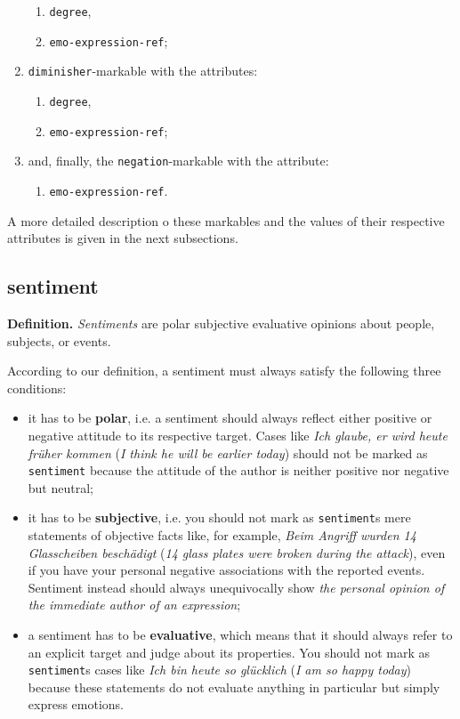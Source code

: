 \documentclass[11pt,a4paper]{article}
\theoremstyle{mytheoremstyle}
\begin{document}
\begin{multicols}{2}
\begin{enumerate}
    \begin{enumerate}
    \item \texttt{degree},
    \item \texttt{emo-expression-ref};
    \end{enumerate}
  \item \texttt{diminisher}-markable with the attributes:
    \begin{enumerate}
    \item \texttt{degree},
    \item \texttt{emo-expression-ref};
    \end{enumerate}
  \item and, finally, the \texttt{negation}-markable with the
    attribute:
    \begin{enumerate}
    \item \texttt{emo-expression-ref}.
    \end{enumerate}
  \end{enumerate}
\end{multicols}
\noindent{}A more detailed description o these markables and the
values of their respective attributes is given in the next
subsections.

\subsection{sentiment}\label{sec:sentiment}
\noindent\textbf{Definition.} \emph{Sentiments} are polar subjective
evaluative opinions about people, subjects, or events.

According to our definition, a sentiment must always satisfy the
following three conditions:
\begin{itemize}
\item it has to be \textbf{polar}, i.e. a sentiment should always
  reflect either positive or negative attitude to its respective
  target.  Cases like \textit{Ich glaube, er wird heute fr\"uher
    kommen} (\textit{I think he will be earlier today}) should not be
  marked as \texttt{sentiment} because the attitude of the author is
  neither positive nor negative but neutral;

\item it has to be \textbf{subjective}, i.e. you should not mark as
  \texttt{sentiment}s mere statements of objective facts like, for
  example, \textit{Beim Angriff wurden 14 Glasscheiben besch\"adigt}
  (\textit{14 glass plates were broken during the attack}), even if
  you have your personal negative associations with the reported
  events.  Sentiment instead should always unequivocally show
  \emph{the personal opinion of the immediate author of an
    expression};

\item a sentiment has to be \textbf{evaluative}, which means that it
  should always refer to an explicit target and judge about its
  properties.  You should not mark as \texttt{sentiment}s cases like
  \textit{Ich bin heute so gl\"ucklich} (\textit{I am so happy today})
  because these statements do not evaluate anything in particular but
  simply express emotions.
\end{itemize}
\end{document}
